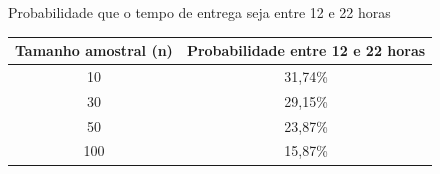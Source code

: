 \documentclass[aspectratio=169,14pt]{beamer}
\begin{document}
\begin{frame}{Probabilidade que o tempo de entrega seja entre 12 e 22 horas}
    \begin{table}[]
        \begin{tabular}{|c|c|}
        \hline
        \textbf{Tamanho amostral (n)} & \textbf{Probabilidade entre 12 e 22 horas} \\ \hline
        10                            & 31,74\%                                    \\ \hline
        30                            & 29,15\%                                    \\ \hline
        50                            & 23,87\%                                    \\ \hline
        100                           & 15,87\%                                    \\ \hline
        \end{tabular}
    \end{table}
\end{frame}
\end{document}
